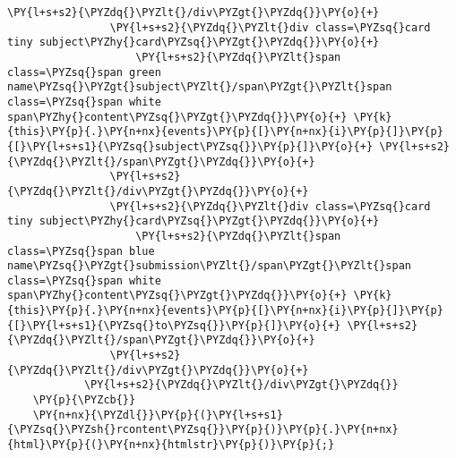 \begin{Verbatim}[commandchars=\\\{\}]
                \PY{l+s+s2}{\PYZdq{}\PYZlt{}/div\PYZgt{}\PYZdq{}}\PY{o}{+}
                \PY{l+s+s2}{\PYZdq{}\PYZlt{}div class=\PYZsq{}card tiny subject\PYZhy{}card\PYZsq{}\PYZgt{}\PYZdq{}}\PY{o}{+}
                    \PY{l+s+s2}{\PYZdq{}\PYZlt{}span class=\PYZsq{}span green name\PYZsq{}\PYZgt{}subject\PYZlt{}/span\PYZgt{}\PYZlt{}span class=\PYZsq{}span white span\PYZhy{}content\PYZsq{}\PYZgt{}\PYZdq{}}\PY{o}{+} \PY{k}{this}\PY{p}{.}\PY{n+nx}{events}\PY{p}{[}\PY{n+nx}{i}\PY{p}{]}\PY{p}{[}\PY{l+s+s1}{\PYZsq{}subject\PYZsq{}}\PY{p}{]}\PY{o}{+} \PY{l+s+s2}{\PYZdq{}\PYZlt{}/span\PYZgt{}\PYZdq{}}\PY{o}{+}
                \PY{l+s+s2}{\PYZdq{}\PYZlt{}/div\PYZgt{}\PYZdq{}}\PY{o}{+}
                \PY{l+s+s2}{\PYZdq{}\PYZlt{}div class=\PYZsq{}card tiny subject\PYZhy{}card\PYZsq{}\PYZgt{}\PYZdq{}}\PY{o}{+}
                    \PY{l+s+s2}{\PYZdq{}\PYZlt{}span class=\PYZsq{}span blue name\PYZsq{}\PYZgt{}submission\PYZlt{}/span\PYZgt{}\PYZlt{}span class=\PYZsq{}span white span\PYZhy{}content\PYZsq{}\PYZgt{}\PYZdq{}}\PY{o}{+} \PY{k}{this}\PY{p}{.}\PY{n+nx}{events}\PY{p}{[}\PY{n+nx}{i}\PY{p}{]}\PY{p}{[}\PY{l+s+s1}{\PYZsq{}to\PYZsq{}}\PY{p}{]}\PY{o}{+} \PY{l+s+s2}{\PYZdq{}\PYZlt{}/span\PYZgt{}\PYZdq{}}\PY{o}{+}
                \PY{l+s+s2}{\PYZdq{}\PYZlt{}/div\PYZgt{}\PYZdq{}}\PY{o}{+}
            \PY{l+s+s2}{\PYZdq{}\PYZlt{}/div\PYZgt{}\PYZdq{}}
    \PY{p}{\PYZcb{}}
    \PY{n+nx}{\PYZdl{}}\PY{p}{(}\PY{l+s+s1}{\PYZsq{}\PYZsh{}rcontent\PYZsq{}}\PY{p}{)}\PY{p}{.}\PY{n+nx}{html}\PY{p}{(}\PY{n+nx}{htmlstr}\PY{p}{)}\PY{p}{;}


\end{Verbatim}

